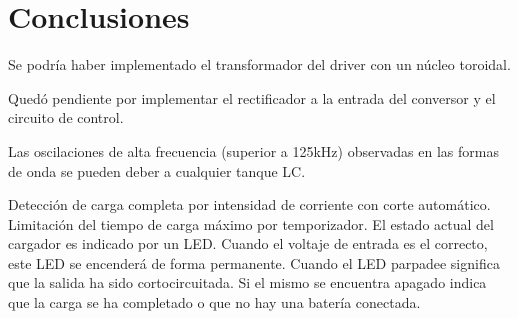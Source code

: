 \section{Conclusiones}



Se podría haber implementado el transformador del driver con un núcleo toroidal. 

Quedó pendiente por implementar el rectificador a la entrada del conversor y el circuito de control.

Las oscilaciones de alta frecuencia (superior a 125kHz) observadas en las formas de onda se pueden deber a cualquier tanque LC. 

Detección de carga completa por intensidad de corriente con corte automático. Limitación del tiempo de carga máximo por temporizador. El estado actual del cargador es indicado por un LED. Cuando el voltaje de entrada es el correcto, este LED se encenderá de forma permanente. Cuando el LED parpadee significa que la salida ha sido cortocircuitada. Si el mismo se encuentra apagado indica que la carga se ha completado o que no hay una batería conectada.